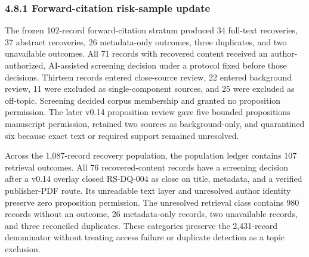 \documentclass[11pt]{article}
\begin{document}
\subsubsection*{4.8.1 Forward-citation risk-sample update}

The frozen 102-record forward-citation stratum produced 34 full-text recoveries, 37 abstract recoveries, 26 metadata-only outcomes, three duplicates, and two unavailable outcomes. All 71 records with recovered content received an author-authorized, AI-assisted screening decision under a protocol fixed before those decisions. Thirteen records entered close-source review, 22 entered background review, 11 were excluded as single-component sources, and 25 were excluded as off-topic. Screening decided corpus membership and granted no proposition permission. The later v0.14 proposition review gave five bounded propositions manuscript permission, retained two sources as background-only, and quarantined six because exact text or required support remained unresolved.

Across the 1,087-record recovery population, the population ledger contains 107 retrieval outcomes. All 76 recovered-content records have a screening decision after a v0.14 overlay closed RS-DQ-004 as close on title, metadata, and a verified publisher-PDF route. Its unreadable text layer and unresolved author identity preserve zero proposition permission. The unresolved retrieval class contains 980 records without an outcome, 26 metadata-only records, two unavailable records, and three reconciled duplicates. These categories preserve the 2,431-record denominator without treating access failure or duplicate detection as a topic exclusion.
\end{document}
